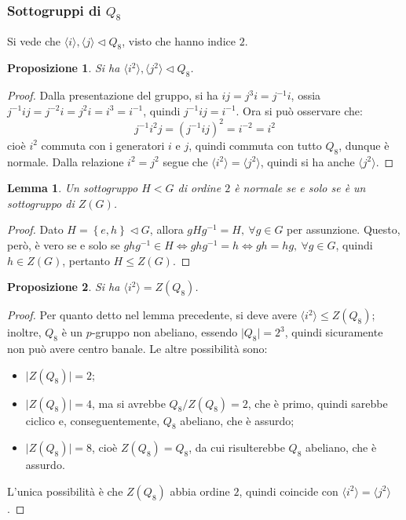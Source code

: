 \documentclass[12pt]{scrartcl}
\theoremstyle{style}
\newtheorem{prop}{Proposizione}[section]
\newtheorem{lemma}{Lemma}[teorema]
\numberwithin{equation}{subsection}
\begin{document}
\subsubsection{Sottogruppi di $Q_8$}
Si vede che $\langle i \rangle, \langle j \rangle\lhd Q_8$, visto che hanno indice $2$.
\begin{prop}
	
Si ha $\langle i^2 \rangle,\langle j^2 \rangle \lhd Q_8$.
\end{prop}
\begin{proof}
Dalla presentazione del gruppo, si ha $ij=j^3i=j^{-1}i$, ossia $j^{-1}ij=j^{-2}i = j^2 i = i^3=i^{-1}$, quindi $j^{-1}ij = i^{-1}$.
Ora si pu\`o osservare che:
\[
j^{-1}i^2 j = (j^{-1}ij)^2 = i^{-2}=i^2
\] 
cio\`e $i^2$ commuta con i generatori $i$ e $j$, quindi commuta con tutto $Q_8$, dunque \`e normale.
Dalla relazione $i^2 = j^2$ segue che $\langle i^2 \rangle=\langle j^2 \rangle$, quindi si ha anche $\langle j^2 \rangle$.
\end{proof}
\begin{lemma}
	Un sottogruppo $H<G$ di ordine $2$ \`e normale se e solo se \`e un sottogruppo di $Z(G)$.
\end{lemma}
	\begin{proof}
		Dato $H = \left\{ e , h \right\} \lhd G$, allora $g H g^{-1}= H , \ \forall g \in G$ per assunzione. 
		Questo, per\`o, \`e vero se e solo se $ghg^{-1}\in H \iff ghg^{-1}=h \iff gh=hg, \ \forall g \in G$, quindi $h \in Z(G)$, pertanto $H \le  Z(G)$.
	\end{proof}
\begin{prop}
	Si ha $\langle i^2 \rangle = Z(Q_8)$.
\end{prop}
	\begin{proof}
		Per quanto detto nel lemma precedente, si deve avere $\langle i^2 \rangle \le Z(Q_8)$; inoltre, $Q_8$ \`e un $p$-gruppo non abeliano, essendo $\lvert Q_8 \rvert =2^3$, quindi sicuramente non pu\`o avere centro banale.
		Le altre possibilit\`a sono:
		\begin{itemize}
			\item $\lvert Z(Q_8) \rvert = 2$;
			\item $\lvert Z(Q_8) \rvert = 4$, ma si avrebbe $Q_8 / Z(Q_8) = 2$, che \`e primo, quindi sarebbe ciclico e, conseguentemente, $Q_8$ abeliano, che \`e assurdo;
			\item $\lvert Z(Q_8) \rvert = 8$, cio\`e $Z(Q_8) = Q_8$, da cui risulterebbe $Q_8$ abeliano, che \`e assurdo.
		\end{itemize}
		L'unica possibilit\`a \`e che $Z(Q_8)$ abbia ordine $2$, quindi coincide con $\langle i ^2\rangle = \langle j^2 \rangle$.
	\end{proof}
\end{document}
